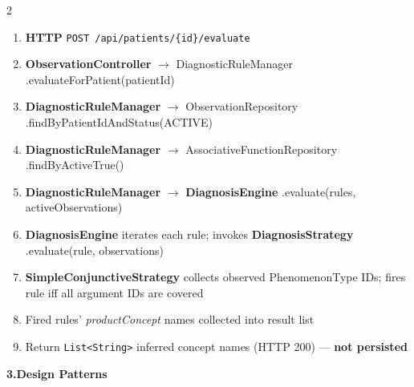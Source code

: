 \documentclass[9pt]{article}
\begin{document}
\begin{multicols}{2}
\begin{enumerate}[leftmargin=1.4em, label=\textbf{\arabic*.}, font=\scriptsize\bfseries,
                  itemsep=2pt, topsep=0pt]
  \scriptsize
  \item \textbf{HTTP} \texttt{POST /api/patients/\{id\}/evaluate}
  \item \textbf{ObservationController} $\rightarrow$ DiagnosticRuleManager\newline
        .evaluateForPatient(patientId)
  \item \textbf{DiagnosticRuleManager} $\rightarrow$ ObservationRepository\newline
        .findByPatientIdAndStatus(ACTIVE)
  \item \textbf{DiagnosticRuleManager} $\rightarrow$ AssociativeFunctionRepository\newline
        .findByActiveTrue()
  \item \textbf{DiagnosticRuleManager} $\rightarrow$ \textbf{DiagnosisEngine}\newline
        .evaluate(rules, activeObservations)
  \item \textbf{DiagnosisEngine} iterates each rule; invokes \textbf{DiagnosisStrategy}\newline
        .evaluate(rule, observations)
  \item \textbf{SimpleConjunctiveStrategy} collects observed PhenomenonType IDs;\newline
        fires rule iff all argument IDs are covered
  \item Fired rules' \textit{productConcept} names collected into result list
  \item Return \texttt{List<String>} inferred concept names (HTTP 200) — \textbf{not persisted}
\end{enumerate}

\end{multicols}

\vspace{4pt}

{\small\bfseries 3.\enspace Design Patterns}
\vspace{3pt}
\end{document}
